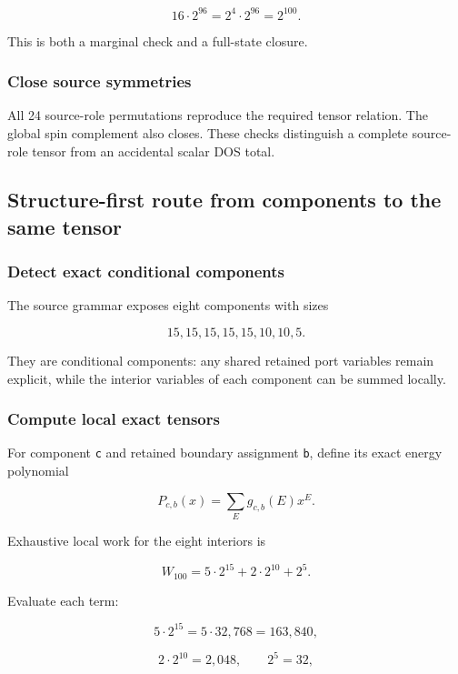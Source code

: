 \[
16\cdot2^{96}=2^4\cdot2^{96}=2^{100}.
\]

This is both a marginal check and a full-state closure.

\subsubsection{Close source symmetries}\label{viii-ch01-close-source-symmetries}

All 24 source-role permutations reproduce the required tensor relation.
The global spin complement also closes. These checks distinguish a
complete source-role tensor from an accidental scalar DOS total.

\subsection{Structure-first route from components to the same
tensor}\label{viii-ch01-structure-first-route-from-components-to-the-same-tensor}

\subsubsection{Detect exact conditional
components}\label{viii-ch01-detect-exact-conditional-components}

The source grammar exposes eight components with sizes

\[
15,15,15,15,15,10,10,5.
\]

They are conditional components: any shared retained port variables
remain explicit, while the interior variables of each component can be
summed locally.

\subsubsection{Compute local exact
tensors}\label{viii-ch01-compute-local-exact-tensors}

For component \texttt{c} and retained boundary assignment \texttt{b},
define its exact energy polynomial

\[
P_{c,b}(x)=\sum_E g_{c,b}(E)x^E.
\]

Exhaustive local work for the eight interiors is

\[
W_{100}
=5\cdot2^{15}+2\cdot2^{10}+2^5.
\]

Evaluate each term:

\[
5\cdot2^{15}=5\cdot32{,}768=163{,}840,
\]

\[
2\cdot2^{10}=2{,}048,
\qquad2^5=32,
\]

